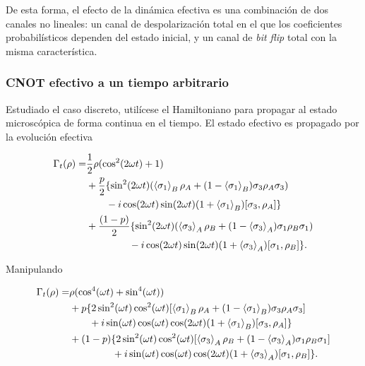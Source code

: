 De esta forma, el efecto de la dinámica efectiva es una combinación de dos canales no lineales: un canal de despolarización total en el que los coeficientes probabilísticos dependen del estado inicial, y un canal de \textit{bit flip} total con la misma característica. 

\subsubsection{CNOT efectivo a un tiempo arbitrario}

Estudiado el caso discreto, utilícese el Hamiltoniano para propagar al estado microscópica de forma continua en el tiempo. El estado efectivo es propagado por la evolución efectiva


\begin{align*}
  \Gamma_{t}(\rho)=&\frac{1}{2}\rho(\cos^{2}(2\omega t)+1)\\
  &+\frac{p}{2}\{\sin^{2}(2\omega t)\qty(\expval{\sigma_{1}}_{B}\rho_{A}+(1-\expval{\sigma_{1}}_{B})\sigma_{3}\rho_{A}\sigma_{3})\\
  & \ \ \ \ \ \ -i\cos(2 \omega t)\sin(2 \omega t)(1+\expval{\sigma_{1}}_{B})[\sigma_{3},\rho_{A}]\}\\
  &+\frac{(1-p)}{2}\{\sin^{2}(2\omega t)\qty(\expval{\sigma_{3}}_{A}\rho_{B}+(1-\expval{\sigma_{3}}_{A})\sigma_{1}\rho_{B}\sigma_{1})\\
  &\ \ \ \ \ \ \ \ \ \ \ \ \ -i\cos(2 \omega t)\sin(2 \omega t)(1+\expval{\sigma_{3}}_{A})[\sigma_{1},\rho_{B}]\}.
\end{align*}

Manipulando

\begin{align*}
  \Gamma_{t}(\rho)=&\rho(\cos^{4}(\omega t)+\sin^{4}(\omega t))\\
  &+p\{2\sin^{2}(\omega t)\cos^{2}(\omega
  t)\qty[\expval{\sigma_{1}}_{B}\rho_{A}+(1-\expval{\sigma_{1}}_{B})\sigma_{3}\rho_{A}\sigma_{3}]\\
  & \ \ \ \ \ \ +i\sin(\omega t)\cos(\omega t)\cos(2\omega t)(1+\expval{\sigma_{1}}_{B})[\sigma_{3},\rho_{A}]\}\\
  &+(1-p)\{2\sin^{2}(\omega t)\cos^{2}(\omega t)\qty[\expval{\sigma_{3}}_{A}\rho_{B}+(1-\expval{\sigma_{3}}_{A})\sigma_{1}\rho_{B}\sigma_{1}]\\
  &\ \ \ \ \ \ \ \ \ \ \ \ \ +i\sin(\omega t)\cos(\omega t)\cos(2\omega t)(1+\expval{\sigma_{3}}_{A})[\sigma_{1},\rho_{B}]\}.
\end{align*} 


